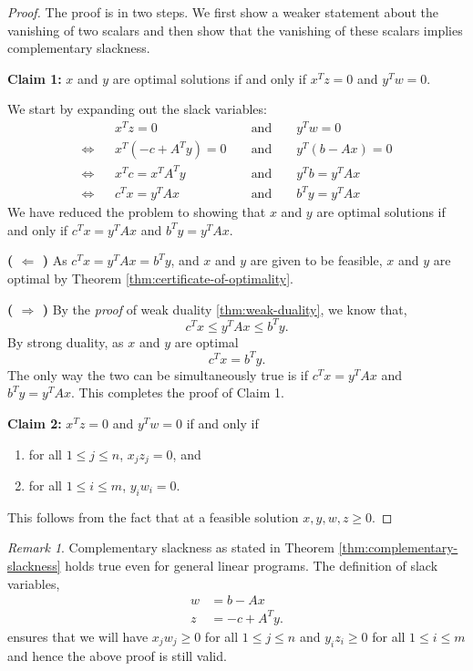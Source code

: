 \documentclass[
]{book}
\providecommand{\tightlist}{%
  \setlength{\itemsep}{0pt}\setlength{\parskip}{0pt}}
\theoremstyle{definition}
\theoremstyle{definition}
\theoremstyle{definition}
\theoremstyle{definition}
\theoremstyle{remark}
\newtheorem*{remark}{Remark}
\begin{document}
\begin{proof}
The proof is in two steps. We first show a weaker statement about the vanishing of two scalars and then show that the vanishing of these scalars implies complementary slackness.

\textbf{Claim 1:} \(x\) and \(y\) are optimal solutions if and only if \(x^T z = 0\) and \(y^T w = 0\).

We start by expanding out the slack variables:
\begin{align*}
    && x^T z = 0 && \mbox{ and } && y^T w = 0 \\ 
  \Leftrightarrow 
  && x^T (-c + A^T y) = 0 && \mbox{ and } && y^T (b - A x) = 0 \\ 
  \Leftrightarrow 
  && x^T c = x^T A^T y && \mbox{ and } && y^T b = y^T A x \\ 
  \Leftrightarrow 
  && c^T x = y^T A x && \mbox{ and } && b^T y = y^T A x
\end{align*}
We have reduced the problem to showing that \(x\) and \(y\) are optimal solutions if and only if \(c^T x = y^T A x\) and \(b^T y = y^T A x\).

\textbf{( \(\Leftarrow\) )}
As \(c^T x = y^T A x = b^T y\), and \(x\) and \(y\) are given to be feasible, \(x\) and \(y\) are optimal by Theorem \ref{thm:certificate-of-optimality}.

\textbf{( \(\Rightarrow\) )}
By the \emph{proof} of weak duality \ref{thm:weak-duality}, we know that,
\[c^T x \le y^T A x \le b^T y.\]
By strong duality, as \(x\) and \(y\) are optimal
\[c^T x = b^T y.\]
The only way the two can be simultaneously true is if \(c^T x = y^T A x\) and \(b^T y = y^T A x\). This
completes the proof of Claim 1.

\textbf{Claim 2:} \(x^T z = 0\) and \(y^T w = 0\) if and only if

\begin{enumerate}
\def\labelenumi{\arabic{enumi}.}
\tightlist
\item
  for all \(1 \le j \le n\), \(x_j z_j = 0\), and
\item
  for all \(1 \le i \le m\), \(y_i w_i = 0\).
\end{enumerate}

This follows from the fact that at a feasible solution \(x, y, w, z \ge 0\).
\end{proof}

\begin{remark}
Complementary slackness as stated in Theorem \ref{thm:complementary-slackness} holds true even for
general linear programs. The definition of slack variables,
\begin{align*}
  w &= b - A x \\ 
  z &= -c + A^T y.
\end{align*}
ensures that we will have \(x_j w_j \ge 0\) for all \(1 \le j \le n\) and \(y_i z_i \ge 0\) for all \(1 \le i \le m\) and hence the above proof is still valid.
\end{remark}
\end{document}

